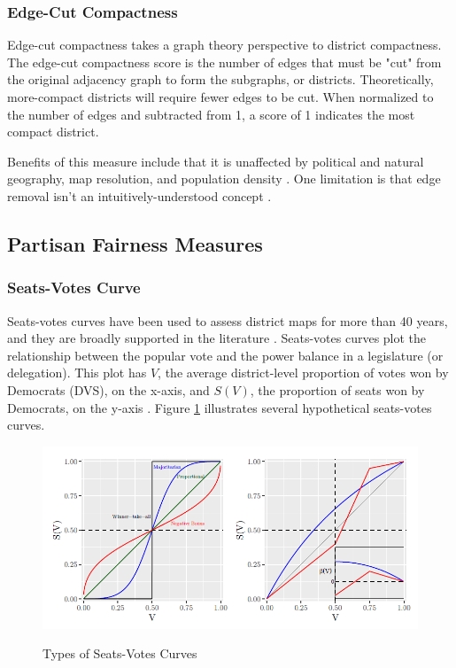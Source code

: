 \subsubsection{Edge-Cut Compactness}
\label{sec:edgecut}

Edge-cut compactness takes a graph theory perspective to district compactness. The edge-cut compactness score is the number of edges that must be "cut" from the original adjacency graph to form the subgraphs, or districts. Theoretically, more-compact districts will require fewer edges to be cut. When normalized to the number of edges and subtracted from 1, a score of 1 indicates the most compact district. \parencite{dube2016}

Benefits of this measure include that it is unaffected by political and natural geography, map resolution, and population density \parencite{mccartan2020}. One limitation is that edge removal isn't an intuitively-understood concept \parencite{warrington2018}.

\subsection{Partisan Fairness Measures}

\subsubsection{Seats-Votes Curve}
\label{sec:seatsvotes}

Seats-votes curves have been used to assess district maps for more than 40 years, and they are broadly supported in the literature \parencite{katz2020}. Seats-votes curves plot the relationship between the popular vote and the power balance in a legislature (or delegation). This plot has $V$, the average district-level proportion of votes won by Democrats (DVS), on the x-axis, and $S(V)$, the proportion of seats won by Democrats, on the y-axis \parencite{tufte1973}. Figure \ref{fig:seatsvotes} illustrates several hypothetical seats-votes curves.

\begin{figure}[hb]
    \caption{Types of Seats-Votes Curves}
    \includegraphics[width=0.6\linewidth]{img/seatsvotes.png}
    \label{fig:seatsvotes}
    \raggedright
\end{figure}

